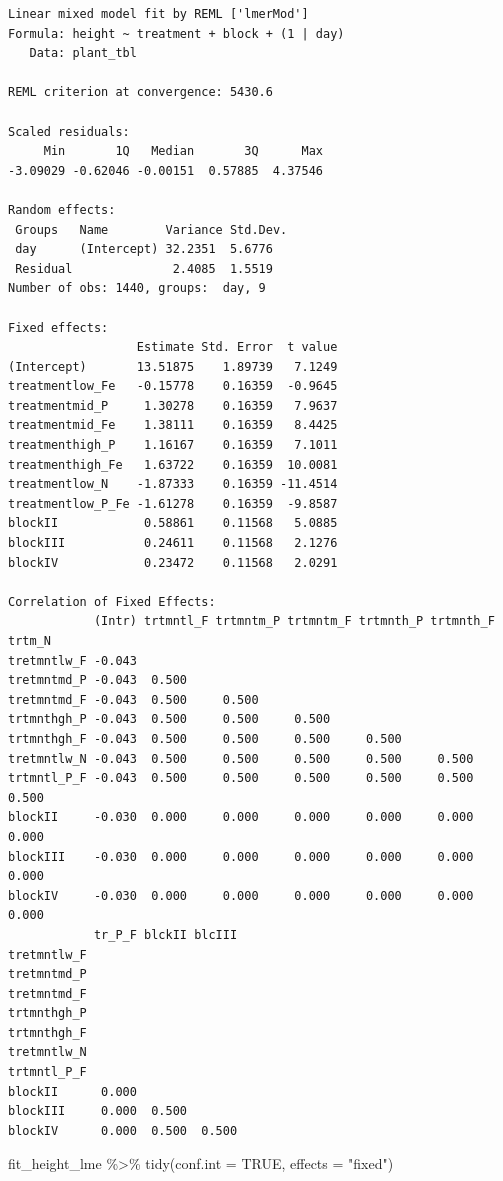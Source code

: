 \documentclass[
  letterpaper,
]{scrbook}
\newenvironment{Shaded}{\begin{snugshade}}{\end{snugshade}}
\newcommand{\AttributeTok}[1]{\textcolor[rgb]{0.40,0.45,0.13}{#1}}
\newcommand{\ConstantTok}[1]{\textcolor[rgb]{0.56,0.35,0.01}{#1}}
\newcommand{\FunctionTok}[1]{\textcolor[rgb]{0.28,0.35,0.67}{#1}}
\newcommand{\NormalTok}[1]{\textcolor[rgb]{0.00,0.23,0.31}{#1}}
\newcommand{\SpecialCharTok}[1]{\textcolor[rgb]{0.37,0.37,0.37}{#1}}
\newcommand{\StringTok}[1]{\textcolor[rgb]{0.13,0.47,0.30}{#1}}
\begin{document}
\begin{verbatim}
Linear mixed model fit by REML ['lmerMod']
Formula: height ~ treatment + block + (1 | day)
   Data: plant_tbl

REML criterion at convergence: 5430.6

Scaled residuals: 
     Min       1Q   Median       3Q      Max 
-3.09029 -0.62046 -0.00151  0.57885  4.37546 

Random effects:
 Groups   Name        Variance Std.Dev.
 day      (Intercept) 32.2351  5.6776  
 Residual              2.4085  1.5519  
Number of obs: 1440, groups:  day, 9

Fixed effects:
                  Estimate Std. Error  t value
(Intercept)       13.51875    1.89739   7.1249
treatmentlow_Fe   -0.15778    0.16359  -0.9645
treatmentmid_P     1.30278    0.16359   7.9637
treatmentmid_Fe    1.38111    0.16359   8.4425
treatmenthigh_P    1.16167    0.16359   7.1011
treatmenthigh_Fe   1.63722    0.16359  10.0081
treatmentlow_N    -1.87333    0.16359 -11.4514
treatmentlow_P_Fe -1.61278    0.16359  -9.8587
blockII            0.58861    0.11568   5.0885
blockIII           0.24611    0.11568   2.1276
blockIV            0.23472    0.11568   2.0291

Correlation of Fixed Effects:
            (Intr) trtmntl_F trtmntm_P trtmntm_F trtmnth_P trtmnth_F trtm_N
tretmntlw_F -0.043                                                         
tretmntmd_P -0.043  0.500                                                  
tretmntmd_F -0.043  0.500     0.500                                        
trtmnthgh_P -0.043  0.500     0.500     0.500                              
trtmnthgh_F -0.043  0.500     0.500     0.500     0.500                    
tretmntlw_N -0.043  0.500     0.500     0.500     0.500     0.500          
trtmntl_P_F -0.043  0.500     0.500     0.500     0.500     0.500     0.500
blockII     -0.030  0.000     0.000     0.000     0.000     0.000     0.000
blockIII    -0.030  0.000     0.000     0.000     0.000     0.000     0.000
blockIV     -0.030  0.000     0.000     0.000     0.000     0.000     0.000
            tr_P_F blckII blcIII
tretmntlw_F                     
tretmntmd_P                     
tretmntmd_F                     
trtmnthgh_P                     
trtmnthgh_F                     
tretmntlw_N                     
trtmntl_P_F                     
blockII      0.000              
blockIII     0.000  0.500       
blockIV      0.000  0.500  0.500
\end{verbatim}

\begin{Shaded}
\begin{Highlighting}[]
\NormalTok{fit\_height\_lme }\SpecialCharTok{\%\textgreater{}\%} 
  \FunctionTok{tidy}\NormalTok{(}\AttributeTok{conf.int =} \ConstantTok{TRUE}\NormalTok{, }\AttributeTok{effects =} \StringTok{"fixed"}\NormalTok{)}
\end{Highlighting}
\end{Shaded}
\end{document}
